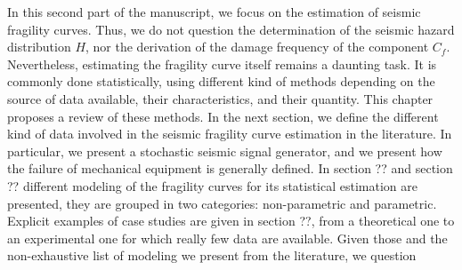 In this second part of the manuscript, we focus on the estimation of seismic fragility curves. 
Thus, we do not question the determination of the seismic hazard distribution $H$, nor the derivation of the damage frequency of the component $C_f$.
Nevertheless, estimating the fragility curve itself %
remains a daunting task. It is commonly done statistically, using different kind of methods depending 
on the source of data available, their characteristics, and their quantity.
This chapter proposes a review of these methods. 
In the next section,
we define the different kind of data involved in the seismic fragility curve estimation in the literature. In particular, we present a stochastic seismic signal generator, and  we present how the failure of mechanical equipment is generally defined.
In section ?? and section ?? different modeling of the fragility curves for its statistical estimation are presented, they are grouped in two categories: non-parametric and parametric.
Explicit examples of case studies are given in section ??, from a theoretical one to an experimental one for which really few data are available.
Given those and the non-exhaustive list of modeling we present from the literature, we question 










%
%










